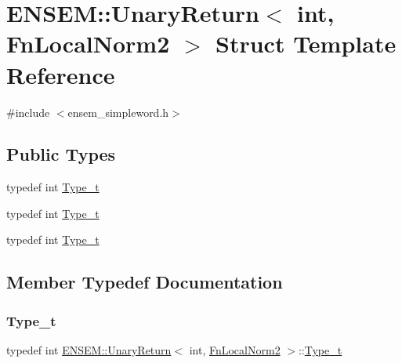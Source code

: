 \hypertarget{structENSEM_1_1UnaryReturn_3_01int_00_01FnLocalNorm2_01_4}{}\section{E\+N\+S\+EM\+:\+:Unary\+Return$<$ int, Fn\+Local\+Norm2 $>$ Struct Template Reference}
\label{structENSEM_1_1UnaryReturn_3_01int_00_01FnLocalNorm2_01_4}


{\ttfamily \#include $<$ensem\+\_\+simpleword.\+h$>$}

\subsection*{Public Types}
\begin{DoxyCompactItemize}
\item 
typedef int \mbox{\hyperlink{structENSEM_1_1UnaryReturn_3_01int_00_01FnLocalNorm2_01_4_aaa78b86bca8291361ec04d107d900df8}{Type\+\_\+t}}
\item 
typedef int \mbox{\hyperlink{structENSEM_1_1UnaryReturn_3_01int_00_01FnLocalNorm2_01_4_aaa78b86bca8291361ec04d107d900df8}{Type\+\_\+t}}
\item 
typedef int \mbox{\hyperlink{structENSEM_1_1UnaryReturn_3_01int_00_01FnLocalNorm2_01_4_aaa78b86bca8291361ec04d107d900df8}{Type\+\_\+t}}
\end{DoxyCompactItemize}


\subsection{Member Typedef Documentation}
\mbox{\label{structENSEM_1_1UnaryReturn_3_01int_00_01FnLocalNorm2_01_4_aaa78b86bca8291361ec04d107d900df8}} 
\subsubsection{\texorpdfstring{Type\_t}{Type\_t}\hspace{0.1cm}{\footnotesize\ttfamily [1/3]}}
{\footnotesize\ttfamily typedef int \mbox{\hyperlink{structENSEM_1_1UnaryReturn}{E\+N\+S\+E\+M\+::\+Unary\+Return}}$<$ int, \mbox{\hyperlink{structENSEM_1_1FnLocalNorm2}{Fn\+Local\+Norm2}} $>$\+::\mbox{\hyperlink{structENSEM_1_1UnaryReturn_3_01int_00_01FnLocalNorm2_01_4_aaa78b86bca8291361ec04d107d900df8}{Type\+\_\+t}}}

